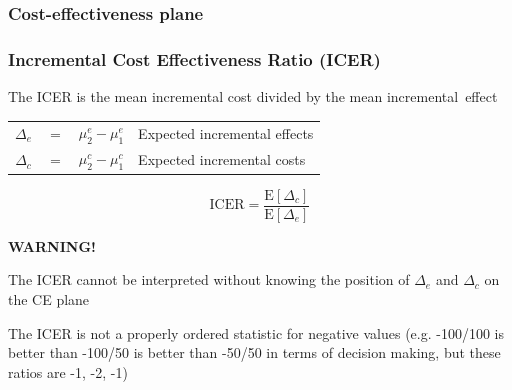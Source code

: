 
\begin{frame}

\frametitle{Cost-effectiveness plane}

\begin{center}
\end{center}

\end{frame}


\begin{frame}

\frametitle{Incremental Cost Effectiveness Ratio (ICER)}

The ICER is the mean incremental cost divided by the mean incremental~effect

\begin{tabular}{ccll}
$\Delta_e$ &$=$& $\mu_2^e - \mu_1^e$ & Expected incremental effects\\
$\Delta_c$ &$=$& $\mu_2^c - \mu_1^c$ & Expected incremental costs
\end{tabular}

\[
\mbox{ICER} = \frac{\mbox{E}[\Delta_c]}{\mbox{E}[\Delta_e]}
\]

\textbf{WARNING!}

\bi
\item The ICER cannot be interpreted without knowing the position of
  $\Delta_e$ and $\Delta_c$ on the CE plane
\item The ICER is not a properly ordered statistic for negative values
  (e.g. -100/100 is better than -100/50 is better than -50/50 in terms
  of decision making, but these ratios are -1, -2, -1)
\ei

\end{frame}

